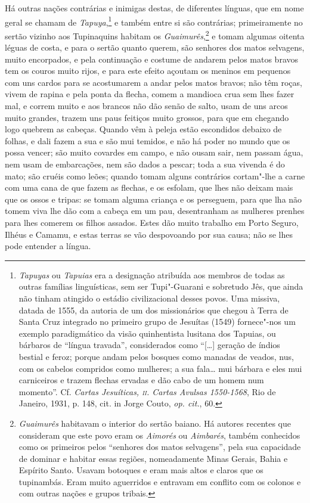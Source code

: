  Há outras nações contrárias e inimigas destas, de diferentes línguas,
que em nome geral se chamam de \textit{Tapuya},\footnote{ \textit{Tapuyas} 
ou \textit{Tapuias} era a designação atribuída aos
membros de todas as outras famílias linguísticas, sem ser Tupi"-Guarani
e sobretudo Jês, que ainda não tinham atingido o estádio
civilizacional desses povos. Uma missiva, datada de 1555, da autoria
de um dos missionários que chegou à Terra de Santa Cruz integrado no
primeiro grupo de Jesuítas (1549) fornece"-nos um exemplo paradigmático
da visão quinhentista lusitana dos Tapuias, ou bárbaros de ``língua
travada'', considerados como ``[\ldots{}] geração de índios bestial e feroz;
porque andam pelos bosques como manadas de veados, nus, com os cabelos
compridos como mulheres; a sua fala\ldots{} mui bárbara e eles mui
carniceiros e trazem flechas ervadas e dão cabo de um homem num
momento''. Cf. \textit{Cartas Jesuíticas, \textsc{ii}. Cartas Avulsas
1550-1568}, Rio de Janeiro, 1931, p. 148, cit. in Jorge Couto,
\textit{op. cit.}, 60.} e também entre si são contrárias;
primeiramente no sertão vizinho aos Tupinaquins habitam os
\textit{Guaimurês},\footnote{ \textit{Guaimurês} habitavam o
interior do sertão baiano. Há autores recentes que consideram que este
povo eram os \textit{Aimorés} ou \textit{Aimbarés}, também conhecidos
como os primeiros pelos ``senhores dos matos selvagens'', pela sua
capacidade de dominar e habitar essas regiões, nomeadamente Minas
Gerais, Bahia e Espírito Santo. Usavam botoques e eram mais altos e
claros que os tupinambás. Eram muito aguerridos e entravam em conflito
com os colonos e com outras nações e grupos tribais.} e tomam
algumas oitenta léguas de costa, e para o sertão quanto querem, são
senhores dos matos selvagens, muito encorpados, e pela continuação e
costume de andarem pelos matos bravos tem os couros muito rijos, e para
este efeito açoutam os meninos em pequenos com uns cardos para se
acostumarem a andar pelos matos bravos; não têm roças, vivem de rapina
e pela ponta da flecha, comem a mandioca crua sem lhes fazer mal, e
correm muito e aos brancos não dão senão de salto, usam de uns arcos
muito grandes, trazem uns paus feitiços muito grossos, para que em
chegando logo quebrem as cabeças. Quando vêm à peleja estão escondidos
debaixo de folhas, e dali fazem a sua e são mui temidos, e não há poder
no mundo que os possa vencer; são muito covardes em campo, e não ousam
sair, nem passam água, nem usam de embarcações, nem são dados a pescar;
toda a sua vivenda é do mato; são cruéis como leões; quando tomam
alguns contrários cortam"-lhe a carne com uma cana de que fazem as
flechas, e os esfolam, que lhes não deixam mais que os ossos e tripas:
se tomam alguma criança e os perseguem, para que lha não tomem viva lhe
dão com a cabeça em um pau, desentranham as mulheres prenhes para lhes
comerem os filhos assados. Estes dão muito trabalho em Porto Seguro,
Ilhéus e Camamu, e estas terras se vão despovoando por sua causa; não
se lhes pode entender a língua. 

